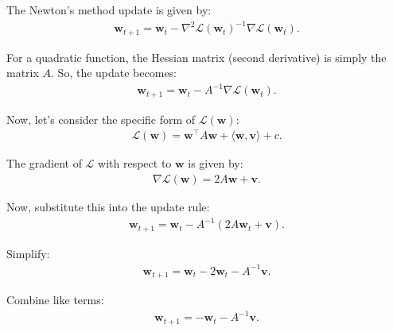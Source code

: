 \documentclass[letterpaper]{article}
\renewcommand{\L}{\mathcal{L}}
\newcommand{\bw}{\mathbf{w}}
\newcommand{\bv}{\mathbf{v}}
\begin{document}
\begin{enumerate}
\begin{enumerate}
        The Newton's method update is given by:
        \begin{equation}
        	\begin{aligned}
        		\bw_{t+1} =  \bw_t - \nabla^2 \L(\bw_t)^{-1} \nabla \L(\bw_t).
        	\end{aligned}
        \end{equation}
        
        For a quadratic function, the Hessian matrix (second derivative) is simply the matrix $A$. So, the update becomes:
        \begin{equation}
        	\begin{aligned}
        		\bw_{t+1} = \bw_t - A^{-1} \nabla \L(\bw_t).
        	\end{aligned}
        \end{equation}
        
        Now, let's consider the specific form of $\L(\bw)$:
        \begin{equation}
        	\begin{aligned}
        		\L(\bw) = \bw^\top A\bw + \langle \bw ,\bv\rangle + c.
        	\end{aligned}
        \end{equation}
        
        The gradient of $\L$ with respect to $\bw$ is given by:
        \begin{equation}
        	\begin{aligned}
        		 \nabla \L(\bw) = 2A\bw + \bv.
        	\end{aligned}
        \end{equation}
        
        Now, substitute this into the update rule:
        \begin{equation}
        	\begin{aligned}
        		\bw_{t+1} = \bw_t - A^{-1} (2A\bw_t + \bv).
        	\end{aligned}
        \end{equation}

        Simplify:
        \begin{equation}
        	\begin{aligned}
        		\bw_{t+1} = \bw_t - 2\bw_t - A^{-1}\bv.
        	\end{aligned}
        \end{equation}
        
        Combine like terms:
        \begin{equation}
        	\begin{aligned}
        		\bw_{t+1} = -\bw_t - A^{-1}\bv.
        	\end{aligned}
        \end{equation}
        

\end{enumerate}
\end{enumerate}
\end{document}

